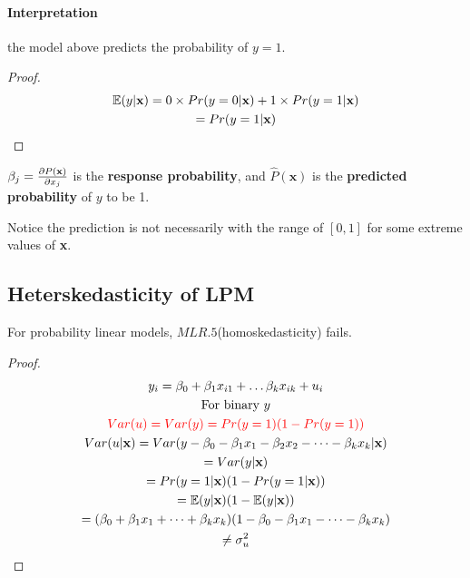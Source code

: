 \documentclass[]{article}
\begin{document}
			\paragraph{Interpretation} the model above predicts the probability of $y=1$.
				\begin{proof}
					\begin{gather*}
						\mathbb{E}({y|\textbf{x}}) = 0 \times Pr(y=0|\textbf{x}) + 1 \times Pr(y=1|\textbf{x}) \\
						= Pr(y=1|\textbf{x})
					\end{gather*}
				\end{proof}
			\begin{remark}
				$\beta_j = \frac{\partial{P(\textbf{x})}}{\partial{x_j}}$ is the \textbf{response probability}, and $\hat{P}(\textbf{x})$ is the \textbf{predicted probability} of $y$ to be 1.
			\end{remark}
			\begin{remark}
				Notice the prediction is not necessarily with the range of $[0,1]$ for some extreme values of \textbf{x}.
			\end{remark}
		\subsection{Heterskedasticity of LPM}
			\begin{remark}
				For probability linear models, $MLR.5$(homoskedasticity) fails.
			\end{remark}
			\begin{proof}
				\begin{gather*}
					y_i = \beta_0 + \beta_1 x_{i1} + \dots \beta_k x_{ik} + u_i \\
					\text{{For binary $y$}} \\
					\textcolor{red}{
						Var(u) = Var(y) = Pr(y=1) (1-Pr(y=1))
					} \\
					Var(u|\textbf{x}) = Var(y - \beta_0 - \beta_1 x_1 - \beta_2 x_2 - \dots - \beta_k x_k | \textbf{x}) \\
					= Var(y | \textbf{x}) \\
					= Pr(y=1|\textbf{x}) (1-Pr(y=1|\textbf{x})) \\
					= \mathbb{E}({y | \textbf{x}}) (1 - \mathbb{E}({y | \textbf{x}})) \\
					= (\beta_0 + \beta_1 x_1 + \dots + \beta_k x_k) (1 - \beta_0 - \beta_1 x_1 - \dots - \beta_k x_k) \\
					\neq \sigma_u^2
				\end{gather*}
			\end{proof}
\end{document}

